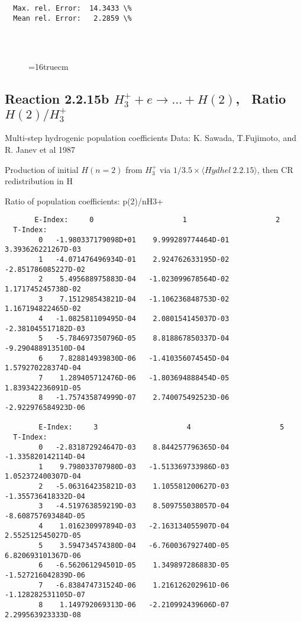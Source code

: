 \documentclass[12pt,dvipdfmx]{article}
\begin{document}
{\begin{small}
\begin{verbatim}
  Max. rel. Error:  14.3433 \%
  Mean rel. Error:   2.2859 \%




\end{verbatim}\end{small}
\begin{figure} \label{2.2.15a}
\epsfxsize=16truecm
\end{figure}
\newpage


\subsection{
Reaction 2.2.15b $ H_3^+ + e \rightarrow ...+ H(2) $, \   Ratio $H(2)/H_3^+  $
}

 Multi-step hydrogenic population coefficients
 Data: K. Sawada, T.Fujimoto, \cite{kn:Sawada} and R. Janev et al 1987

 Production of initial $H(n=2)$ from $H_3^+$ via $1/3.5 \times \langle Hydhel~ 2.2.15\rangle$,
 then CR redistribution in H

 Ratio of population coefficients: p(2)/nH3+

\begin{small}\begin{verbatim}
       E-Index:     0                     1                     2
  T-Index:
        0   -1.980337179098D+01    9.999289774464D-01    3.393626221267D-03
        1   -4.071476496934D-01    2.924762633195D-02   -2.851786085227D-02
        2    5.495688975883D-04   -1.023099678564D-02    1.171745245738D-02
        3    7.151298543821D-04   -1.106236848753D-02    1.167194822465D-02
        4   -1.082581109495D-04    2.080154145037D-03   -2.381045517182D-03
        5   -5.784697350796D-05    8.818867850337D-04   -9.290488913510D-04
        6    7.828814939830D-06   -1.410356074545D-04    1.579270228374D-04
        7    1.289405712476D-06   -1.803694888454D-05    1.839342236091D-05
        8   -1.757435874999D-07    2.740075492523D-06   -2.922976584923D-06

        E-Index:     3                     4                     5
  T-Index:
        0   -2.831872924647D-03    8.844257796365D-04   -1.335820142114D-04
        1    9.798033707980D-03   -1.513369733986D-03    1.052372400307D-04
        2   -5.063164235821D-03    1.105581200627D-03   -1.355736418332D-04
        3   -4.519763859219D-03    8.509755038057D-04   -8.608757693484D-05
        4    1.016230997894D-03   -2.163134055907D-04    2.552512545027D-05
        5    3.594734574380D-04   -6.760036792740D-05    6.820693101367D-06
        6   -6.562061294501D-05    1.349897286883D-05   -1.527216042839D-06
        7   -6.838474731524D-06    1.216126202961D-06   -1.128282531105D-07
        8    1.149792069313D-06   -2.210992439606D-07    2.299563923333D-08


\end{verbatim}
\end{small}}
\end{document}
